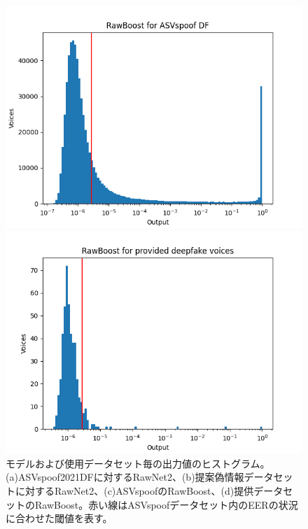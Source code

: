 \begin{figure}
\begin{minipage}[b]{0.45\hsize}
        \subcaption{}
    \end{minipage}\\
    \begin{minipage}[b]{0.45\hsize}
        \centering
        \includegraphics[width=\linewidth]{figures/rawboost_asv.png} 
        \subcaption{}
    \end{minipage}
    \begin{minipage}[b]{0.45\hsize}
        \centering
        \includegraphics[width=\linewidth]{figures/rawboost_prop.png}
        \subcaption{}
    \end{minipage}
    \caption{モデルおよび使用データセット毎の出力値のヒストグラム。(a)ASVspoof2021DFに対するRawNet2、(b)提案偽情報データセットに対するRawNet2、(c)ASVspoofのRawBoost、(d)提供データセットのRawBoost。赤い線はASVspoofデータセット内のEERの状況に合わせた閾値を表す。}
    \label{fig:hist}
\end{figure}

